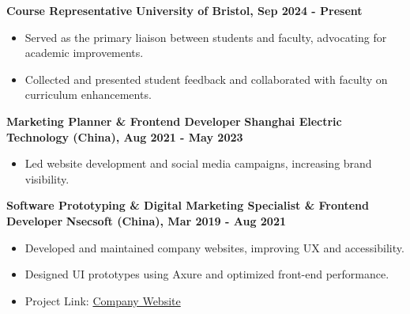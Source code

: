 \documentclass[10pt,a4paper]{article} %
\begin{document}
\textbf{Course Representative} \hfill \textbf{University of Bristol, Sep 2024 - Present} \\
\begin{itemize}
    \item Served as the primary liaison between students and faculty, advocating for academic improvements.
    \item Collected and presented student feedback and collaborated with faculty on curriculum enhancements.
\end{itemize}

\textbf{Marketing Planner \& Frontend Developer} \hfill \textbf{Shanghai Electric Technology (China), Aug 2021 - May 2023} \\
\begin{itemize}
    \item Led website development and social media campaigns, increasing brand visibility.
\end{itemize}

\textbf{Software Prototyping \& Digital Marketing Specialist \& Frontend Developer} \hfill \textbf{Nsecsoft (China), Mar 2019 - Aug 2021} \\
\begin{itemize}
    \item Developed and maintained company websites, improving UX and accessibility.
    \item Designed UI prototypes using Axure and optimized front-end performance.
    \item Project Link: \href{https://www.nsecsoft.com/}{Company Website}
\end{itemize}
\end{document}

